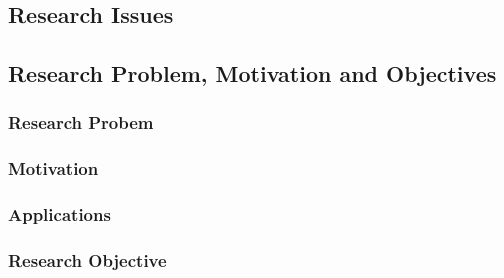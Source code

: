 \documentclass[10pt]{llncs}
\begin{document}
%


%
\subsection{Research Issues}


%


%


%


%
\subsection{Research Problem, Motivation and Objectives}

%
\subsubsection{Research Probem}


%
\subsubsection{Motivation}


%

%

%

%
\subsubsection{Applications}


%
\subsubsection{Research Objective}
\end{document}
